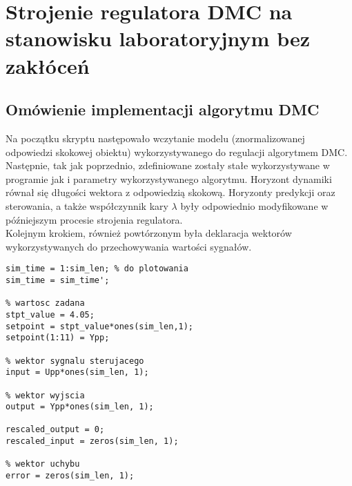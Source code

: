 

\section{Strojenie regulatora DMC na stanowisku laboratoryjnym bez zakłóceń}
\label{zad4_lab_opis}
\subsection{Omówienie implementacji algorytmu DMC}
Na początku skryptu następowało wczytanie modelu (znormalizowanej odpowiedzi skokowej obiektu) wykorzystywanego do regulacji algorytmem DMC.\\
\indent{} Następnie, tak jak poprzednio, zdefiniowane zostały stałe wykorzystywane w programie jak i parametry wykorzystywanego algorytmu. Horyzont dynamiki równał się długości wektora z odpowiedzią skokową. Horyzonty predykcji oraz sterowania, a także współczynnik kary $\lambda$ były odpowiednio modyfikowane w późniejszym procesie strojenia regulatora. \\
\indent{} Kolejnym krokiem, również powtórzonym była deklaracja wektorów wykorzystywanych do przechowywania wartości sygnałów.

\begin{lstlisting}[style=custommatlab,frame=single,label={zad4_vecDMC_lst},caption={Inizjalizacja wektorów używanych do przechowywania sygnałów.},captionpos=b]
% czas symulacji
sim_time = 1:sim_len; % do plotowania
sim_time = sim_time';

% wartosc zadana
stpt_value = 4.05;
setpoint = stpt_value*ones(sim_len,1);
setpoint(1:11) = Ypp;

% wektor sygnalu sterujacego
input = Upp*ones(sim_len, 1);

% wektor wyjscia
output = Ypp*ones(sim_len, 1);

rescaled_output = 0;
rescaled_input = zeros(sim_len, 1);

% wektor uchybu
error = zeros(sim_len, 1);

\end{lstlisting}

